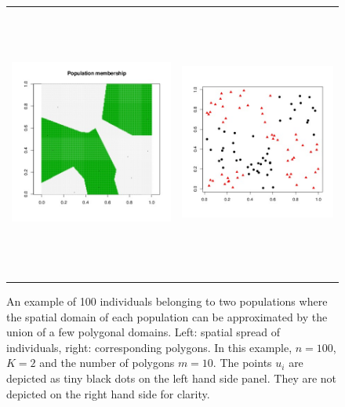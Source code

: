 \documentclass[a4paper,10pt]{article}
\begin{document}
\begin{figure}[h]
\begin{tabular}{cc}
\includegraphics[height=9cm,width=8cm]{./fig/example_spatial3_bis.jpeg} & \includegraphics[height=9cm,width=7.6cm]{./fig/example_spatial3_ter.jpeg} \\
\end{tabular}
\caption{An example of 100 individuals belonging to two populations  where the 
spatial domain of each population can be approximated by the union of a few polygonal domains. Left: spatial spread of individuals, 
right: corresponding polygons. 
In this example, $n=100$, $K=2$ and the number of polygons $m=10$.
The points $u_i$ are depicted as tiny black dots on the left hand side panel. They are not depicted on the right hand side 
for clarity.}\label{fig:spaprior2}
\end{figure}
\end{document}
